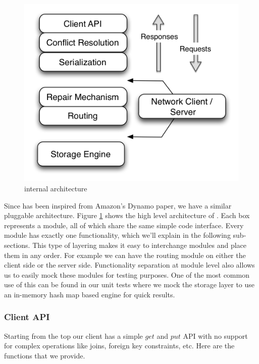 \documentclass[10pt,twocolumn,preprint,natbib,authoryear]{sigplanconf}
\begin{document}
\begin{figure}
  \centering
    \includegraphics[scale=0.45]{images/arch.png}
  \caption{\projectname{} internal architecture}
  \label{arch}
\end{figure}


Since \projectname{} has been inspired from Amazon's Dynamo paper, we have a similar pluggable architecture. Figure \ref{arch} shows the high level architecture of \projectname{}. Each box represents a module, all of which share the same simple code interface. Every module has exactly one functionality, which we'll explain in the following sub-sections. This type of layering makes it easy to interchange modules and place them in any order. For example we can have the routing module on either the client side or the server side. Functionality separation at module level also allows us to easily mock these modules for testing purposes. One of the most common use of this can be found in our unit tests where we mock the storage layer to use an in-memory hash map based engine for quick results.  


\subsubsection {Client API }  
\label{sec:system_architecture:system_components:client_api}

Starting from the top our client has a simple $get$ and $put$ API with no support for complex operations like joins, foreign key constraints, etc. Here are the functions that we provide. 
\end{document}
